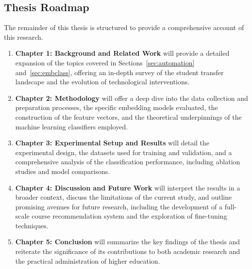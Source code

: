 \begin{introduction}
\subsection{Thesis Roadmap}
The remainder of this thesis is structured to provide a comprehensive account of this research.
\begin{enumerate}
\item \textbf{Chapter 1: Background and Related Work} will provide a detailed expansion of the topics covered in Sections~\ref{sec:automation} and~\ref{sec:embclass}, offering an in-depth survey of the student transfer landscape and the evolution of technological interventions.
\item \textbf{Chapter 2: Methodology} will offer a deep dive into the data collection and preparation processes, the specific embedding models evaluated, the construction of the feature vectors, and the theoretical underpinnings of the machine learning classifiers employed.
\item \textbf{Chapter 3: Experimental Setup and Results} will detail the experimental design, the datasets used for training and validation, and a comprehensive analysis of the classification performance, including ablation studies and model comparisons.
\item \textbf{Chapter 4: Discussion and Future Work} will interpret the results in a broader context, discuss the limitations of the current study, and outline promising avenues for future research, including the development of a full-scale course recommendation system and the exploration of fine-tuning techniques.
\item \textbf{Chapter 5: Conclusion} will summarize the key findings of the thesis and reiterate the significance of its contributions to both academic research and the practical administration of higher education.
\end{enumerate}

\end{introduction}
